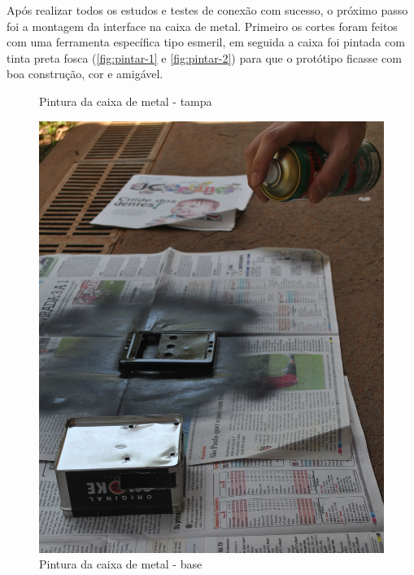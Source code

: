 \documentclass[
		12pt,				%
		openright,			%
		oneside,			%
		a4paper,			%
		chapter=TITLE,		%
		english,			%
		brazil				%
	]{abntex2}
\begin{document}
Após realizar todos os estudos e testes de conexão com sucesso, o próximo passo foi a montagem da interface na caixa de metal. Primeiro os cortes foram feitos com uma ferramenta específica tipo esmeril, em seguida a caixa foi pintada com tinta preta fosca (\autoref{fig:pintar-1} e \autoref{fig:pintar-2}) para que o protótipo ficasse com boa construção, cor e amigável.

\begin{figure}[htb]
	\centering
 	\begin{minipage}{0.47\textwidth}
		\centering
		\caption{\label{fig:pintar-1}Pintura da caixa de metal - tampa}
		\includegraphics[width=1\textwidth]{img/pintar-1.jpg}
	\end{minipage}
	\hfill
	\begin{minipage}{0.47\textwidth}
		\centering
		\caption{\label{fig:pintar-2}Pintura da caixa de metal - base}

\end{minipage}
\end{figure}
\end{document}
